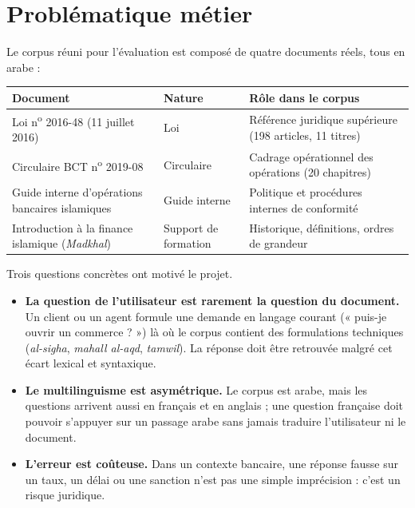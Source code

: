 \documentclass[a4paper,12pt]{report}
\begin{document}
\section{Problématique métier}
Le corpus réuni pour l'évaluation est composé de quatre documents réels, tous en arabe :

\begin{table}[H]
\centering
\small
\begin{tabular}{p{4.6cm}p{2.9cm}p{6.4cm}}
\toprule
\textbf{Document} & \textbf{Nature} & \textbf{Rôle dans le corpus} \\
\midrule
Loi n\textsuperscript{o} 2016-48 (11 juillet 2016) & Loi & Référence juridique supérieure
(198 articles, 11 titres) \\
Circulaire BCT n\textsuperscript{o} 2019-08 & Circulaire & Cadrage opérationnel des opérations
(20 chapitres) \\
Guide interne d'opérations bancaires islamiques & Guide interne & Politique et procédures
internes de conformité \\
Introduction à la finance islamique (\emph{Madkhal}) & Support de formation & Historique,
définitions, ordres de grandeur \\
\bottomrule
\end{tabular}
\end{table}

Trois questions concrètes ont motivé le projet.

\begin{itemize}
  \item \textbf{La question de l'utilisateur est rarement la question du document.} Un client ou
        un agent formule une demande en langage courant (« puis-je ouvrir un commerce ? ») là où
        le corpus contient des formulations techniques (\emph{al-sigha}, \emph{mahall al-aqd},
        \emph{tamwil}). La réponse doit être retrouvée malgré cet écart lexical et syntaxique.
  \item \textbf{Le multilinguisme est asymétrique.} Le corpus est arabe, mais les questions
        arrivent aussi en français et en anglais ; une question française doit pouvoir s'appuyer
        sur un passage arabe sans jamais traduire l'utilisateur ni le document.
  \item \textbf{L'erreur est coûteuse.} Dans un contexte bancaire, une réponse fausse sur un taux,
        un délai ou une sanction n'est pas une simple imprécision : c'est un risque juridique.
\end{itemize}
\end{document}
